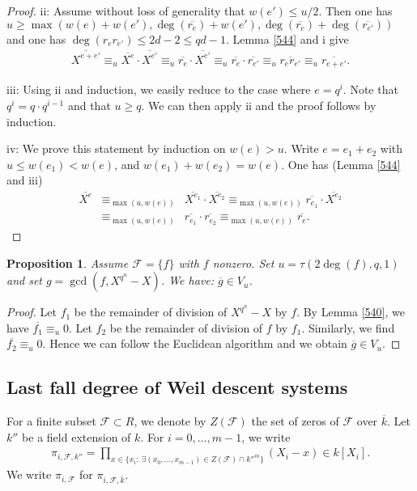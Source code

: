 \documentclass{amsart}
\theoremstyle{plain}
\newtheorem{proposition}[theorem]{Proposition}
\theoremstyle{definition}
\begin{document}
\begin{proof}
ii: Assume without loss of generality that $w(e') \leq u/2$. Then one has $u \geq \max(w(e)+w(e'), \deg(\overline{r_e})+w(e'), \deg(\overline{r_e})+\deg(\overline{r_{e'}}))$ and one has $\deg(r_e r_{e'})\leq 2d-2 \leq qd-1$.
Lemma \ref{544} and i give
\begin{eqnarray*}
\overline{X^{e+e'}} \equiv_{u} \overline{X^e} \cdot \overline{X^{e'}} \equiv_{u} \overline{r_e} \cdot \overline{X^{e'}}  \equiv_{u} \overline{r_e} \cdot \overline{r_{e'}} \equiv_{u} \overline{r_e r_{e'}} \equiv_u \overline{r_{e+e'}}.
\end{eqnarray*}

iii: Using ii and induction, we easily reduce to the case where $e=q^i$. Note that $q^i= q \cdot q^{i-1}$ and that $u \geq q$. We can then apply ii and the proof follows by induction.

iv: We prove this statement by induction on $w(e)>u$. Write $e=e_1+e_2$ with $u \leq w(e_1)<w(e)$, and $w(e_1)+w(e_2)=w(e)$. One has (Lemma \ref{544} and iii)
\begin{eqnarray*}
\overline{X^e} &\equiv_{\max(u,w(e))}& \overline{X^{e_1}} \cdot \overline{X^{e_2}} \equiv_{\max(u,w(e))} \overline{r_{e_1}} \cdot \overline{X^{e_2}} \\
&\equiv_{\max(u,w(e))}& \overline{r_{e_1}} \cdot \overline{r_{e_2}} \equiv_{\max(u,w(e))} \overline{r_{e}}.
\end{eqnarray*}
\end{proof}

\begin{proposition}  \label{901}
Assume $\mathcal{F}=\{f\}$ with $f$ nonzero. Set $u=\tau(2 \deg(f), q,1)$ and set $g=\gcd(f,X^{q^n}-X)$.
We have: $\overline{g} \in V_u$.
\end{proposition}
\begin{proof}
Let $f_1$ be the remainder of division of $X^{q^n}-X$ by $f$. By Lemma \ref{540}, we have $\overline{f_1} \equiv_u 0$. Let $f_2$ be the remainder of division of $f$ by $f_1$. Similarly, we find $\overline{f_2} \equiv_u 0$. Hence we can follow the Euclidean algorithm and we obtain $\overline{g} \in V_u$.
\end{proof}

\subsection{Last fall degree of Weil descent systems}

For a finite subset $\mathcal{F} \subset R$, we denote by $Z(\mathcal{F})$ the set of zeros of $\mathcal{F}$ over $\overline{k}$. Let $k''$ be a field extension of $k$. For $i=0,\ldots,m-1$, we write
\begin{eqnarray*}
\pi_{i,\mathcal{F},k''} = \prod_{x \in \{x_i:\ \exists (x_0,\ldots,x_{m-1}) \in Z(\mathcal{F}) \cap k''^m \}} (X_i-x) \in k[X_i].
\end{eqnarray*} 
We write $\pi_{i,\mathcal{F}}$ for $\pi_{i,\mathcal{F},\overline{k}}$. 
\end{document}

